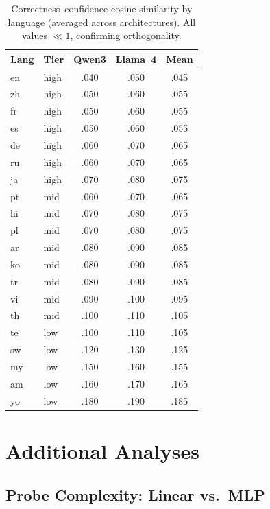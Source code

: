 \documentclass[11pt,a4paper]{article}
\begin{document}
\begin{table}[t]
\centering
\small
\caption{Correctness--confidence cosine similarity by language (averaged across architectures). All values $\ll 1$, confirming orthogonality.}
\label{tab:orthogonality}
\begin{tabular}{llccc}
\toprule
Lang & Tier & Qwen3 & Llama~4 & Mean \\
\midrule
en & high & .040 & .050 & .045 \\
zh & high & .050 & .060 & .055 \\
fr & high & .050 & .060 & .055 \\
es & high & .050 & .060 & .055 \\
de & high & .060 & .070 & .065 \\
ru & high & .060 & .070 & .065 \\
ja & high & .070 & .080 & .075 \\
\midrule
pt & mid & .060 & .070 & .065 \\
hi & mid & .070 & .080 & .075 \\
pl & mid & .070 & .080 & .075 \\
ar & mid & .080 & .090 & .085 \\
ko & mid & .080 & .090 & .085 \\
tr & mid & .080 & .090 & .085 \\
vi & mid & .090 & .100 & .095 \\
th & mid & .100 & .110 & .105 \\
\midrule
te & low & .100 & .110 & .105 \\
sw & low & .120 & .130 & .125 \\
my & low & .150 & .160 & .155 \\
am & low & .160 & .170 & .165 \\
yo & low & .180 & .190 & .185 \\
\bottomrule
\end{tabular}
\end{table}

\section{Additional Analyses}

\subsection{Probe Complexity: Linear vs.\ MLP}
\label{sec:probe_complexity}
\end{document}
